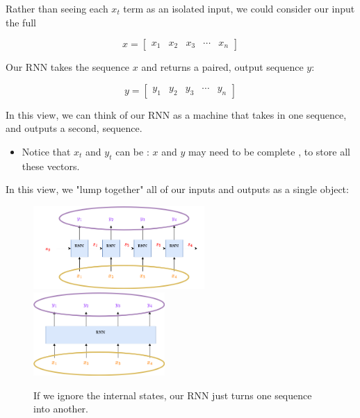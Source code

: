         \begin{concept}
            Rather than seeing each $x_t$ term as an isolated input, we could consider our input the full 
    
            \begin{equation*}
                x = 
                \begin{bmatrix}
                    x_1 & x_2 & x_3 & \cdots & x_n
                \end{bmatrix}
            \end{equation*}
    
            Our RNN takes the sequence $x$ and returns a paired, output sequence $y$:
    
            \begin{equation*}
                y = 
                \begin{bmatrix}
                    y_1 & y_2 & y_3 & \cdots & y_n
                \end{bmatrix}
            \end{equation*}
    
            In this view, we can think of our RNN as a machine that takes in one sequence, and outputs a second,  sequence.

            \subsecdiv

            \begin{itemize}
                \item Notice that $x_t$ and $y_t$ can be : $x$ and $y$ may need to be complete , to store all these vectors.
            \end{itemize}
        \end{concept}
    
        In this view, we "lump together" all of our inputs and outputs as a single object:
    
        \begin{figure}[H]
            \centering
            \includegraphics[width=65mm]{images/rnn_images/gathered_sequence.png}
            \includegraphics[width=50mm]{images/rnn_images/rnn_seq2seq.png}
    
            \caption*{If we ignore the internal states, our RNN just turns one sequence into another.}
        \end{figure}

